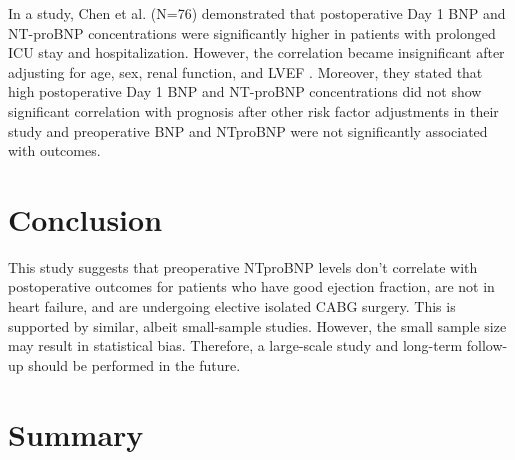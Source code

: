 \documentclass[14pt,a4paper,onecolumn]{extarticle}
\begin{document}
In a study, Chen et al. (N=76) demonstrated that postoperative Day 1 BNP and NT-proBNP concentrations were significantly higher in patients with prolonged ICU stay and hospitalization. However, the correlation became insignificant after adjusting for age, sex,  renal function, and LVEF \citep{Chen2013}. Moreover, they stated that high postoperative Day 1 BNP and NT-proBNP concentrations did not show significant correlation with prognosis after other risk factor adjustments in their study and preoperative BNP and NTproBNP were not significantly associated with outcomes.


\section{Conclusion}

This study suggests that preoperative NTproBNP levels don't correlate with postoperative outcomes for patients who have good ejection fraction, are not in heart failure, and are undergoing elective isolated CABG surgery. This is supported by similar, albeit small-sample studies.  However, the small sample size may result in statistical bias. Therefore, a large-scale study and long-term follow-up should be performed in the future.


\section{Summary}

\newpage


\end{document}
